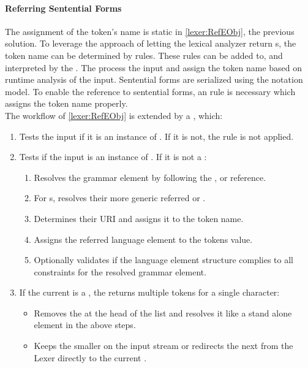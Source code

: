 \paragraph{Referring Sentential Forms}
The assignment of the token's name is  static in \ref{lexer:RefEObj}, the previous solution. To leverage the approach of letting the lexical analyzer return s, the token name can be determined by rules. These rules can be added to, and interpreted by the . The  process the input  and assign the token name based on runtime analysis of the input. Sentential forms are serialized using the notation model. To enable the reference to sentential forms, an  rule is necessary which assigns the token name properly. \\
The workflow of \ref{lexer:RefEObj} is extended by a , which:
\begin{enumerate}
	\item Tests the input  if it is an instance of . If it is not, the rule is not applied.
	\item Tests if the input is an instance of . 
	If it is not a :
	\begin{enumerate}
		\item Resolves the grammar element by following the ,  or  reference. 
		\item For s, resolves their more generic referred  or .
		\item Determines their URI and assigns it to the token name.
		\item Assigns the referred language element  to the tokens value.
		\item Optionally validates if the language element structure complies to all constraints for the resolved grammar element.
	\end{enumerate}
	\item If the current  is a , the  returns multiple tokens for a single character:
	\begin{itemize}
		\item Removes the  at the head of the list and resolves it like a stand alone element in the above steps.
		\item Keeps the smaller  on the input stream or redirects the next  from the Lexer directly to the current .  \\
	\end{itemize}
\end{enumerate}

